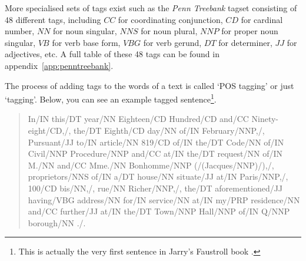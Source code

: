 More specialised sets of tags exist such as the \textit{Penn Treebank} tagset \autocite{Marcus1993} consisting of 48 different tags, including $CC$ for coordinating conjunction, $CD$ for cardinal number, $NN$ for noun singular, $NNS$ for noun plural, $NNP$ for proper noun singular, $VB$ for verb base form, $VBG$ for verb gerund, $DT$ for determiner, $JJ$ for adjectives, etc. A full table of these 48 tags can be found in appendix~\ref{app:penntreebank}.

The process of adding tags to the words of a text is called `\ac{POS} tagging' or just `tagging'. Below, you can see an example tagged sentence\footnote{This is actually the very first sentence in Jarry's Faustroll book \citeyear{Jarry1996}.}.

\begin{quote}
  In\slash{}IN this\slash{}DT year\slash{}NN Eighteen\slash{}CD Hundred\slash{}CD and\slash{}CC Ninety-eight\slash{}CD,\slash{}, the\slash{}DT Eighth\slash{}CD day\slash{}NN of\slash{}IN February\slash{}NNP,\slash{}, Pursuant\slash{}JJ to\slash{}IN article\slash{}NN 819\slash{}CD of\slash{}IN the\slash{}DT Code\slash{}NN of\slash{}IN Civil\slash{}NNP Procedure\slash{}NNP and\slash{}CC at\slash{}IN the\slash{}DT request\slash{}NN of\slash{}IN M.\slash{}NN and\slash{}CC Mme.\slash{}NN Bonhomme\slash{}NNP (\slash{}(Jacques\slash{}NNP)\slash{}),\slash{}, proprietors\slash{}NNS of\slash{}IN a\slash{}DT house\slash{}NN situate\slash{}JJ at\slash{}IN Paris\slash{}NNP,\slash{}, 100\slash{}CD bis\slash{}NN,\slash{}, rue\slash{}NN Richer\slash{}NNP,\slash{}, the\slash{}DT aforementioned\slash{}JJ having\slash{}VBG address\slash{}NN for\slash{}IN service\slash{}NN at\slash{}IN my\slash{}PRP residence\slash{}NN and\slash{}CC further\slash{}JJ at\slash{}IN the\slash{}DT Town\slash{}NNP Hall\slash{}NNP of\slash{}IN Q\slash{}NNP borough\slash{}NN .\slash{}.
\end{quote}





